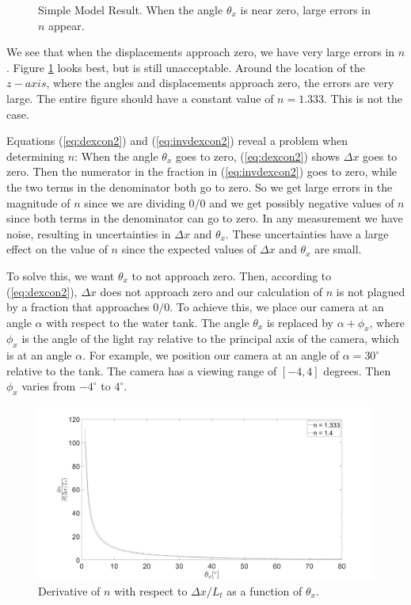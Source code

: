\documentclass[smallextended]{svjour3}       %
\begin{document}
\begin{figure}[htbp]
\begin{subfigure}{.45\linewidth}
	\label{fig:nfrontal}
\end{subfigure}
\caption{Simple Model Result. When the angle $\theta_x$ is near zero, large errors in $n$ appear. }
\label{fig:simmod}
\end{figure}

We see that when the displacements approach zero, we have very large errors in $n$. Figure \ref{fig:nfrontal} looks best, but is still unacceptable. Around the location of the $z-axis$, where the angles and displacements approach zero, the errors are very large. The entire figure should have a constant value of $n = 1.333$. This is not the case.
 
Equations (\ref{eq:dexcon2}) and (\ref{eq:invdexcon2}) reveal a problem when determining $n$: When the angle $\theta_x$ goes to zero, (\ref{eq:dexcon2}) shows $\Delta x$ goes to zero. Then the numerator in the fraction in (\ref{eq:invdexcon2}) goes to zero, while the two terms in the denominator both go to zero. So we get large errors in the magnitude of $n$ since we are dividing $0/0$ and we get possibly negative values of $n$ since both terms in the denominator can go to zero. In any measurement we have noise, resulting in uncertainties in $\Delta x$ and $\theta_x$. These uncertainties have a large effect on the value of $n$ since the expected values of $\Delta x$ and $\theta_x$ are small. %

To solve this, we want $\theta_x$ to not approach zero. Then, according to (\ref{eq:dexcon2}), $\Delta x$ does not approach zero and our calculation of $n$ is not plagued by a fraction that approaches $0/0$. To achieve this, we place our camera at an angle $\alpha$ with respect to the water tank. The angle $\theta_x$ is replaced by $\alpha+\phi_x$, where $\phi_x$ is the angle of the light ray relative to the principal axis of the camera, which is at an angle $\alpha$. For example, we position our camera at an angle of $\alpha=30^\circ$ relative to the tank. The camera has a viewing range of $[-4,4]$ degrees. Then $\phi_x$ varies from $-4^\circ$ to $4^\circ$.

\begin{figure}[hpbt]
	\includegraphics[width=\textwidth, keepaspectratio]{dndx.png}
	\caption{Derivative of $n$ with respect to $\Delta x / L_t$ as a function of $\theta_x$.}	
	\label{fig:dndx}
\end{figure}
\end{document}
